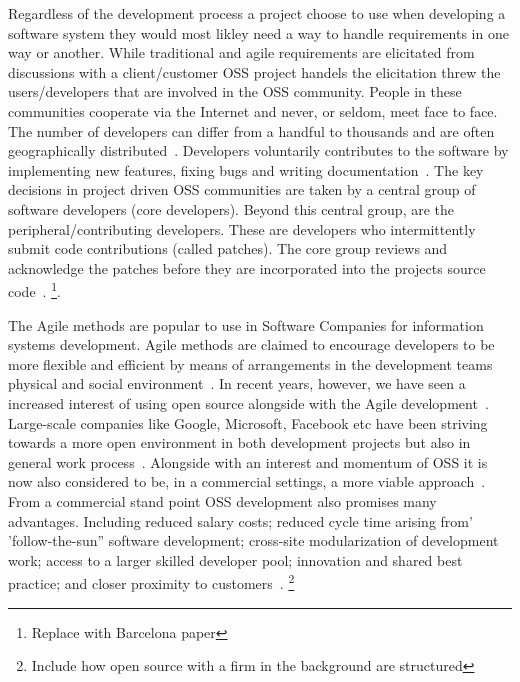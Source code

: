 \documentclass[a4paper,11pt]{article}
\begin{document}
{	%


Regardless of the development process a project choose to use when developing a software system they would most likley need a way to handle requirements in one way or another. While traditional and agile requirements are elicitated from discussions with a client/customer OSS project handels the elicitation threw the users/developers that are involved in the OSS community. People in these communities cooperate via the Internet and never, or seldom, meet face to face. The number of developers can differ from a handful to thousands and are often geographically distributed~\cite{Maccormack2006}. Developers voluntarily contributes to the software by implementing new features, fixing bugs and writing documentation~\cite{Maccormack2006}. The key decisions in project driven OSS communities are taken by a central group of software developers (core developers). Beyond this central group, are the peripheral/contributing developers. These are developers who intermittently submit code contributions (called patches). The core group reviews and acknowledge the patches before they are incorporated into the projects source code~\cite{Crowston2006}. \footnote{Replace with Barcelona paper}.


The Agile methods are popular to use in Software Companies for information systems development. Agile methods are claimed to encourage developers to be more flexible and efficient by means of arrangements in the development teams physical and social environment~\cite{Jansson2015}. In recent years, however, we have seen a increased interest of using open source alongside with the Agile development~\cite{Author2008,Jansson2015}. Large-scale companies like Google, Microsoft, Facebook etc have been striving towards a more open environment in both development projects but also in general work process~\cite{Schmidt2014}. Alongside with an interest and momentum of OSS it is now also considered to be, in a commercial settings, a more viable approach~\cite{Author2008}. From a commercial stand point OSS development also promises many advantages. Including reduced salary costs; reduced cycle time arising from' 'follow-the-sun'' software development; cross-site modularization of development work; access to a larger skilled developer pool; innovation and shared best practice; and closer proximity to customers~\cite{Author2008}. \footnote{Include how open source with a firm in the background are structured}

}
\end{document}
